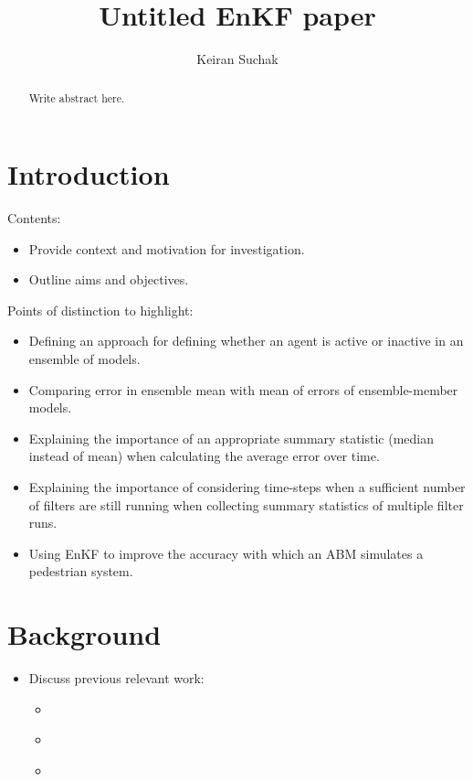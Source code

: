 \documentclass{article}
\title{Untitled EnKF paper}
\author{Keiran Suchak}
\begin{document}
\maketitle{}

\begin{abstract}
    Write abstract here.
\end{abstract}

\section{Introduction}\label{sec:intro}

Contents:
\begin{itemize}
    \item Provide context and motivation for investigation.
    \item Outline aims and objectives.
\end{itemize}

Points of distinction to highlight:
\begin{itemize}
    \item Defining an approach for defining whether an agent is active or
        inactive in an ensemble of models.
    \item Comparing error in ensemble mean with mean of errors of
        ensemble-member models.
    \item Explaining the importance of an appropriate summary statistic
        (median instead of mean) when calculating the average error over
        time.
    \item Explaining the importance of considering time-steps when a
        sufficient number of filters are still running when collecting
        summary statistics of multiple filter runs.
    \item Using EnKF to improve the accuracy with which an ABM simulates a
        pedestrian system.
\end{itemize}

\section{Background}\label{sec:background}

\begin{itemize}
    \item Discuss previous relevant work:
    \begin{itemize}
        \item \citet{ward2016dynamic}
        \item \citet{malleson2020simulating}
        \item \citet{clay2020towards}
    \end{itemize}
\end{itemize}
\end{document}
